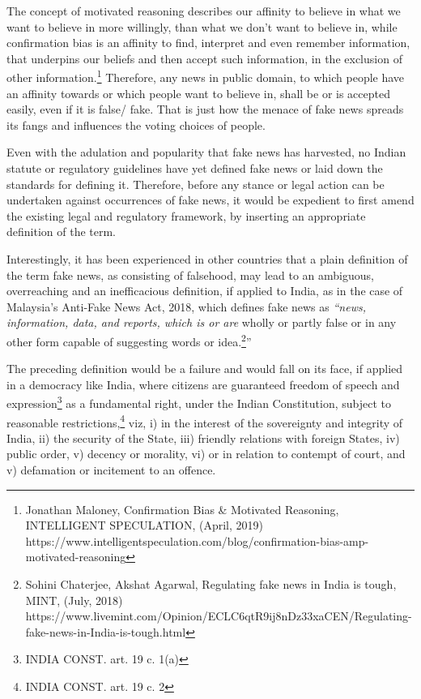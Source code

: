 \begin{multicols}{2}
The concept of motivated reasoning describes our affinity to believe in what we want to
believe in more willingly, than what we don’t want to believe in, while confirmation bias is
an affinity to find, interpret and even remember information, that underpins our beliefs and
then accept such information, in the exclusion of other information.\footnote{Jonathan Maloney, Confirmation Bias & Motivated Reasoning, INTELLIGENT SPECULATION, (April,
2019) https://www.intelligentspeculation.com/blog/confirmation-bias-amp-motivated-reasoning} Therefore, any news in
public domain, to which people have an affinity towards or which people want to believe in,
shall be or is accepted easily, even if it is false/ fake. That is just how the menace of fake
news spreads its fangs and influences the voting choices of people.

Even with the adulation and popularity that fake news has harvested, no Indian statute or
regulatory guidelines have yet defined fake news or laid down the standards for defining it.
Therefore, before any stance or legal action can be undertaken against occurrences of fake news, 
it would be expedient to first amend the existing legal and regulatory framework, by
inserting an appropriate definition of the term.

Interestingly, it has been experienced in other countries that a plain definition of the term fake
news, as consisting of falsehood, may lead to an ambiguous, overreaching and an
inefficacious definition, if applied to India, as in the case of Malaysia’s Anti-Fake News Act,
2018, which defines fake news as \textit{“news, information, data, and reports, which is or are}
wholly or partly false or in any other form capable of suggesting words or idea.\footnote{Sohini Chaterjee, 
Akshat Agarwal, Regulating fake news in India is tough, MINT, (July, 2018) https://www.livemint.com/Opinion/ECLC6qtR9ij8nDz33xaCEN/Regulating-fake-news-in-India-is-tough.html}”

The preceding definition would be a failure and would fall on its face, if applied in a
democracy like India, where citizens are guaranteed freedom of speech and expression\footnote{INDIA CONST. art. 19 c. 1(a)} as a
fundamental right, under the Indian Constitution, subject to reasonable restrictions,\footnote{INDIA CONST. art. 19 c. 2} viz, i) in
the interest of the sovereignty and integrity of India, ii) the security of the State, iii) friendly
relations with foreign States, iv) public order, v) decency or morality, vi) or in relation to
contempt of court, and v) defamation or incitement to an offence.


\end{multicols}
